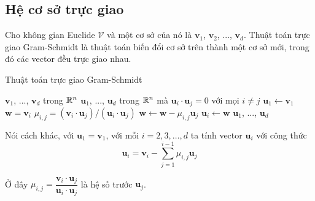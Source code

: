 \subsection*{Hệ cơ sở trực giao}

Cho không gian Euclide $\mathcal{V}$ và một cơ sở của nó là $\bm{v}_1$, $\bm{v}_2$, ..., $\bm{v}_d$. Thuật toán trực giao Gram-Schmidt là thuật toán biến đổi cơ sở trên thành một cơ sở mới, trong đó các vector đều trực giao nhau.

\begin{algorithm}
	\caption{Thuật toán trực giao Gram-Schmidt}
	\begin{algorithmic}
		\Require $\bm{v}_1$, ..., $\bm{v}_d$ trong $\mathbb{R}^n$
		\Ensure $\bm{u}_1$, ..., $\bm{u}_d$ trong $\mathbb{R}^n$ mà $\bm{u}_i \cdot \bm{u}_j = 0$ với mọi $i \neq j$
		\State $\bm{u}_1 \gets \bm{v}_1$
			\State $\bm{w} = \bm{v}_i$
			\State $\mu_{i,j} = (\bm{v}_i \cdot \bm{u}_j) / (\bm{u}_i \cdot \bm{u}_j)$
			\State $\bm{w} \gets \bm{w} - \mu_{i, j} \bm{u}_j$
			\EndFor
			\State $\bm{u}_i \gets \bm{w}$
		\EndFor
		\State \Return $\bm{u}_1$, ..., $\bm{u}_d$
	\end{algorithmic}
\end{algorithm}

Nói cách khác, với $\bm{u}_1 = \bm{v}_1$, với mỗi $i = 2, 3, \ldots, d$ ta tính vector $\bm{u}_i$ với công thức
\begin{equation*}
	\bm{u}_i = \bm{v}_i - \sum_{j=1}^{i-1} \mu_{i,j} \bm{u}_j
\end{equation*}

Ở đây $\mu_{i,j} = \dfrac{\bm{v}_i \cdot \bm{u}_j}{\bm{u}_i \cdot \bm{u}_j}$ là hệ số trước $\bm{u}_j$.

